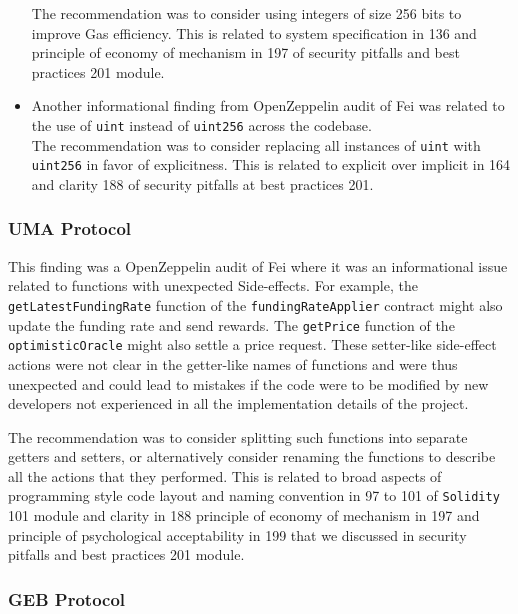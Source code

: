 \begin{itemize}
  The recommendation was to consider using integers of size 256 bits to
  improve Gas efficiency. This is related to system specification in 136
  and principle of economy of mechanism in 197 of security pitfalls and
  best practices 201 module.
\item
  Another informational finding from OpenZeppelin audit of Fei was
  related to the use of \texttt{uint} instead of \texttt{uint256} across
  the codebase.\\

  The recommendation was to consider replacing all instances of
  \texttt{uint} with \texttt{uint256} in favor of explicitness. This is
  related to explicit over implicit in 164 and clarity 188 of security
  pitfalls at best practices 201.
\end{itemize}

\subsubsection{UMA Protocol}\label{uma-protocol}

This finding was a OpenZeppelin audit of Fei where it was an
informational issue related to functions with unexpected Side-effects.
For example, the \texttt{getLatestFundingRate} function of the
\texttt{fundingRateApplier} contract might also update the funding rate
and send rewards. The \texttt{getPrice} function of the
\texttt{optimisticOracle} might also settle a price request. These
setter-like side-effect actions were not clear in the getter-like names
of functions and were thus unexpected and could lead to mistakes if the
code were to be modified by new developers not experienced in all the
implementation details of the project.

The recommendation was to consider splitting such functions into
separate getters and setters, or alternatively consider renaming the
functions to describe all the actions that they performed. This is
related to broad aspects of programming style code layout and naming
convention in 97 to 101 of \texttt{Solidity} 101 module and clarity in
188 principle of economy of mechanism in 197 and principle of
psychological acceptability in 199 that we discussed in security
pitfalls and best practices 201 module.

\subsubsection{GEB Protocol}\label{geb-protocol}

